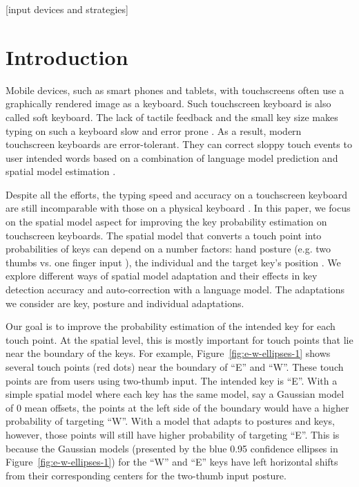 \documentclass{sigchi}
\begin{document}

[input devices and strategies]


\section{Introduction}
Mobile devices, such as smart phones and tablets, with touchscreens often use
a graphically rendered image as a keyboard. Such touchscreen keyboard is also called
soft keyboard. The lack of tactile feedback and the small key size makes typing on
such a keyboard slow and error prone \cite{Brewster:2007, Rabin:2004}.
As a result, modern touchscreen keyboards are error-tolerant. They can correct sloppy touch
events to user intended words based on a combination of language model prediction 
and spatial model estimation \cite{AlFaraj:2009, Aulagner:2010, Goodman:2002, Gunawardana:2010}. 

Despite all the efforts, the typing speed and accuracy on a touchscreen keyboard are
still incomparable with those on a physical keyboard \cite{Hoggan:2008}. In this paper,
we focus on the spatial model aspect for improving the key probability estimation 
on touchscreen keyboards. The spatial model that converts a touch point into probabilities of keys 
can depend on a number factors: hand posture (e.g. two thumbs vs. one finger input \cite{Azenkot:2012}), 
the individual \cite{Findlater:2012} and the target key's position \cite{Azenkot:2012}.
We explore different ways of spatial model adaptation and
their effects in key detection accuracy and auto-correction with a language
model. The adaptations we consider are key, posture and individual adaptations. 

Our goal is to improve the probability estimation of the intended key for each touch point.
At the spatial level, this is mostly important for touch points that lie near the 
boundary of the keys. For example, Figure~\ref{fig:e-w-ellipses-1} shows several touch points (red dots)
near the boundary of ``E'' and ``W''. These touch points are from users using two-thumb input.
The intended key is ``E''. With a simple spatial
model where each key has the same model, say a Gaussian model \cite{Goodman:2002} of 0 mean offsets, the points
at the left side of the boundary would have a higher probability of targeting ``W''.
With a model that adapts to postures and keys, however, those points will still have higher
probability of targeting ``E''. This is because the Gaussian models (presented
by the blue 0.95 confidence ellipses in Figure~\ref{fig:e-w-ellipses-1}) for the ``W'' and
``E'' keys have left horizontal shifts from their corresponding centers for the two-thumb input posture. 
\end{document}
